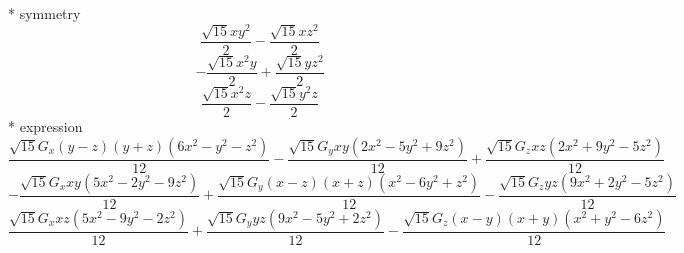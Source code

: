 \documentclass[fleqn,8pt]{jsarticle}
\begin{document}
\noindent\quad ** symmetry
\begin{dmath*}
\frac{\sqrt{15} x y^{2}}{2} - \frac{\sqrt{15} x z^{2}}{2}
\end{dmath*}
\begin{dmath*}
- \frac{\sqrt{15} x^{2} y}{2} + \frac{\sqrt{15} y z^{2}}{2}
\end{dmath*}
\begin{dmath*}
\frac{\sqrt{15} x^{2} z}{2} - \frac{\sqrt{15} y^{2} z}{2}
\end{dmath*}
\noindent\quad ** expression
\begin{dmath*}
\frac{\sqrt{15} G_{x} \left(y - z\right) \left(y + z\right) \left(6 x^{2} - y^{2} - z^{2}\right)}{12} - \frac{\sqrt{15} G_{y} x y \left(2 x^{2} - 5 y^{2} + 9 z^{2}\right)}{12} + \frac{\sqrt{15} G_{z} x z \left(2 x^{2} + 9 y^{2} - 5 z^{2}\right)}{12}
\end{dmath*}
\begin{dmath*}
- \frac{\sqrt{15} G_{x} x y \left(5 x^{2} - 2 y^{2} - 9 z^{2}\right)}{12} + \frac{\sqrt{15} G_{y} \left(x - z\right) \left(x + z\right) \left(x^{2} - 6 y^{2} + z^{2}\right)}{12} - \frac{\sqrt{15} G_{z} y z \left(9 x^{2} + 2 y^{2} - 5 z^{2}\right)}{12}
\end{dmath*}
\begin{dmath*}
\frac{\sqrt{15} G_{x} x z \left(5 x^{2} - 9 y^{2} - 2 z^{2}\right)}{12} + \frac{\sqrt{15} G_{y} y z \left(9 x^{2} - 5 y^{2} + 2 z^{2}\right)}{12} - \frac{\sqrt{15} G_{z} \left(x - y\right) \left(x + y\right) \left(x^{2} + y^{2} - 6 z^{2}\right)}{12}
\end{dmath*}
\end{document}
